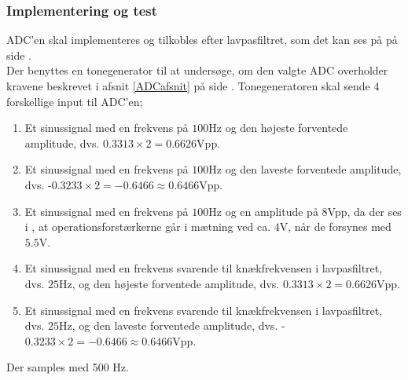 \subsubsection{Implementering og test}
ADC'en skal implementeres og tilkobles efter lavpasfiltret, som det kan ses på  på side \pageref{kravblok}. \\
Der benyttes en tonegenerator til at undersøge, om den valgte ADC overholder kravene beskrevet i afsnit \ref{ADCafsnit} på side \pageref{ADCafsnit}. Tonegeneratoren skal sende 4 forskellige input til ADC'en;
\begin{enumerate}
	\item Et sinussignal med en frekvens på $100$Hz og den højeste forventede amplitude, dvs. $0.3313 \times 2 = 0.6626\text{Vpp}$.
	\item Et sinussignal med en frekvens på $100$Hz og den laveste forventede amplitude, dvs. -$0.3233 \times 2 = -0.6466 \approx 0.6466\text{Vpp}$.
	\item Et sinussignal med en frekvens på $100$Hz og en amplitude på $8$Vpp, da der ses i , at operationsforstærkerne går i mætning ved ca. $4$V, når de forsynes med $5.5$V. 
	\item Et sinussignal med en frekvens svarende til knækfrekvensen i lavpasfiltret, dvs. $25$Hz, og den højeste forventede amplitude, dvs. $0.3313 \times 2 = 0.6626\text{Vpp}$.
	\item Et sinussignal med en frekvens svarende til knækfrekvensen i lavpasfiltret, dvs. $25$Hz, og den laveste forventede amplitude, dvs. -$0.3233 \times 2 = -0.6466 \approx 0.6466\text{Vpp}$.
\end{enumerate}
Der samples med 500 Hz.